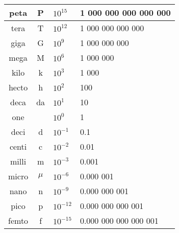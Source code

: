 \documentclass[12pt]{article}
\begin{document}
\begin{spacing}{0.8}
\begin{multicols*}{2}
\begin{flushleft}
\begin{outline}[longenum]
 \\
\begin{tabular}{|c c l l|}                                   \hline
peta  & P     & $10^{ 15}$ & \hfill 1 000 000 000 000 000 \\ \hline
tera  & T     & $10^{ 12}$ & \hfill     1 000 000 000 000 \\ \hline
giga  & G     & $10^{  9}$ & \hfill         1 000 000 000 \\ \hline
mega  & M     & $10^{  6}$ & \hfill             1 000 000 \\ \hline
kilo  & k     & $10^{  3}$ & \hfill                 1 000 \\ \hline
hecto & h     & $10^{  2}$ & \hfill                   100 \\ \hline
deca  & da    & $10^{  1}$ & \hfill                    10 \\ \hline
one   &       & $10^{ 0 }$ & \hfill       1 \hfill \hfill \\ \hline
deci  & d     & $10^{- 1}$ & 0.1                          \\ \hline
centi & c     & $10^{- 2}$ & 0.01                         \\ \hline
milli & m     & $10^{- 3}$ & 0.001                        \\ \hline
micro & $\mu$ & $10^{- 6}$ & 0.000 001                    \\ \hline
nano  & n     & $10^{- 9}$ & 0.000 000 001                \\ \hline
pico  & p     & $10^{-12}$ & 0.000 000 000 001            \\ \hline
femto & f     & $10^{-15}$ & 0.000 000 000 000 001        \\ \hline
\end{tabular}



\end{outline}
\end{flushleft}
\end{multicols*}
\end{spacing}
\end{document}
